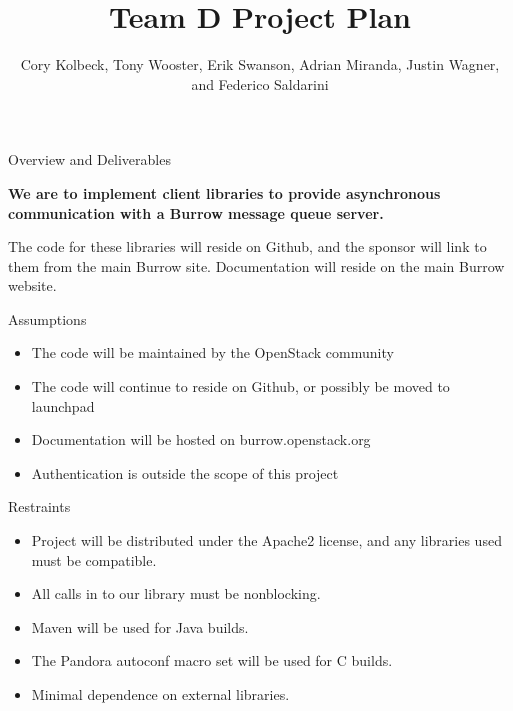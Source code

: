 \documentclass{beamer}
\begin{document}
\title{Team D Project Plan}
\author[CK, TW, ES, AM, JW, \& FS]{Cory Kolbeck, Tony Wooster, Erik Swanson, Adrian Miranda, Justin Wagner, and Federico Saldarini}

\begin{frame}
  \titlepage
\end{frame}

\begin{frame}{Overview and Deliverables}
  \begin{center}{
      \large
      \textbf{We are to implement client libraries to provide asynchronous communication with a Burrow message queue server.}

      \vspace{1cm}
      
      The code for these libraries will reside on Github, and the sponsor will link to them from the main Burrow site. 
      Documentation will reside on the main Burrow website. 
    }
  \end{center}
\end{frame}

\begin{frame}{Assumptions}

  \begin{itemize}
  \item The code will be maintained by the OpenStack community
  \item The code will continue to reside on Github, or possibly be moved to launchpad
  \item Documentation will be hosted on burrow.openstack.org
  \item Authentication is outside the scope of this project
  \end{itemize}

\end{frame}

\begin{frame}{Restraints}

  \begin{itemize}
  \item Project will be distributed under the Apache2 license, and any libraries used must be compatible.
  \item All calls in to our library must be nonblocking.
  \item Maven will be used for Java builds.
  \item The Pandora autoconf macro set will be used for C builds.
  \item Minimal dependence on external libraries.
  \end{itemize}

\end{frame}
\end{document}
